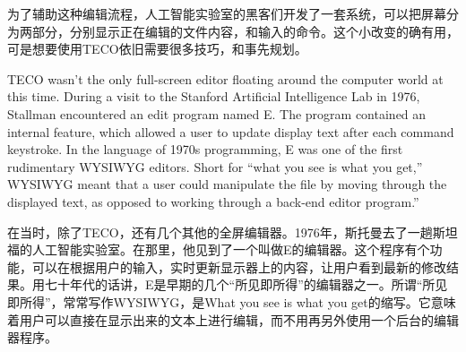 \ifdefined\chs
为了辅助这种编辑流程，人工智能实验室的黑客们开发了一套系统，可以把屏幕分为两部分，分别显示正在编辑的文件内容，和输入的命令。这个小改变的确有用，可是想要使用TECO依旧需要很多技巧，和事先规划。
\fi

\ifdefined\eng
TECO wasn't the only full-screen editor floating around the computer world at this time. During a visit to the Stanford Artificial Intelligence Lab in 1976, Stallman encountered an edit program named E. The program contained an internal feature, which allowed a user to update display text after each command keystroke. In the language of 1970s programming, E was one of the first rudimentary WYSIWYG editors. Short for ``what you see is what you get,'' WYSIWYG meant that a user could manipulate the file by moving through the displayed text, as opposed to working through a back-end editor program.''
\fi

\ifdefined\chs
在当时，除了TECO，还有几个其他的全屏编辑器。1976年，斯托曼去了一趟斯坦福的人工智能实验室。在那里，他见到了一个叫做E的编辑器。这个程序有个功能，可以在根据用户的输入，实时更新显示器上的内容，让用户看到最新的修改结果。用七十年代的话讲，E是早期的几个``所见即所得''的编辑器之一。所谓``所见即所得''，常常写作WYSIWYG，是What you see is what you get的缩写。它意味着用户可以直接在显示出来的文本上进行编辑，而不用再另外使用一个后台的编辑器程序。
\fi

